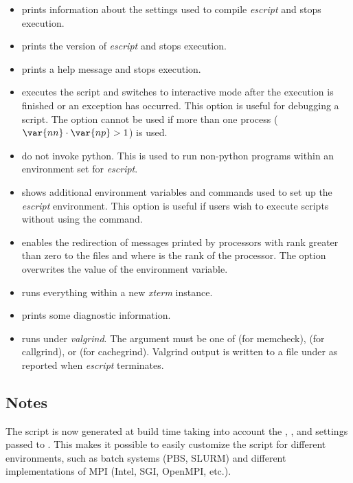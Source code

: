 \begin{itemize}
\item[\programopt{-c}] prints information about the settings used to compile {\it escript} and stops execution.

\item[\programopt{-V}] prints the version of {\it escript} and stops execution.

\item[\programopt{-h}] prints a help message and stops execution.

\item[\programopt{-i}] executes the script  and switches to
    interactive mode after the execution is finished or an exception has occurred.
    This option is useful for debugging a script.
    The option cannot be used if more than one process ($\var{nn} \cdot \var{np}>1$) is used.

\item[\programopt{-b}] do not invoke python. This is used to run non-python
    programs within an environment set for {\it escript}.

\item[\programopt{-e}] shows additional environment variables and commands
    used to set up the {\it escript} environment.
    This option is useful if users wish to execute scripts without using
    the  command.

\item[\programopt{-o}] enables the redirection of messages printed by
    processors with \MPI rank greater than zero to the files
     and  where  is
    the rank of the processor.
    The option overwrites the value of the  environment
    variable.

\item[\programopt{-x}] runs everything within a new \emph{xterm} instance.

\item[\programopt{-v}] prints some diagnostic information.

\item[\programopt{-m} \var{tool}] runs under \emph{valgrind}. The argument
     must be one of  (for memcheck),  (for callgrind),
    or  (for cachegrind). Valgrind output is written to a file under
     as reported when {\it escript} terminates.
\end{itemize}

\subsection{Notes}
The  script is now generated at build time taking into
account the , , and  settings
passed to . This makes it possible to easily customize the
script for different environments, such as batch systems (PBS, SLURM) and
different implementations of MPI (Intel, SGI, OpenMPI, etc.).

